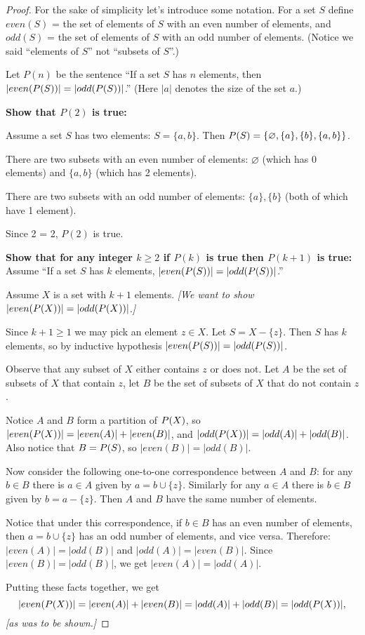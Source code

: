 \documentclass[14pt]{extarticle}
\let\mathscr\relax
\newcommand{\ps}{\mathscr{P}}
\newcommand{\es}{\varnothing}
\begin{document}
\begin{proof}
  For the sake of simplicity let's introduce some notation. For a set $S$ define \(even(S)\) = the set of elements of
  $S$ with an even number of elements, and \(odd(S)\) = the set of elements of $S$ with an odd number of elements.
  (Notice we said ``elements of $S$'' not ``subsets of $S$''.)

  Let $P(n)$ be the sentence “If a set $S$ has $n$ elements, then \(|even(\ps(S))| = |odd(\ps(S))|\).” (Here $|a|$ denotes the size of the set $a$.)

  {\bf Show that $P(2)$ is true:}

  Assume a set $S$ has two elements: \(S = \{a, b\}\). Then \(\ps(S) = \{\es, \{a\}, \{b\}, \{a, b\}\}\).

  There are two subsets with an even number of elements: \(\es\) (which has 0 elements) and \(\{a, b\}\) (which has 2
  elements).

  There are two subsets with an odd number of elements: \(\{a\}, \{b\}\) (both of which have 1 element).

  Since 2 = 2, $P(2)$ is true.

    {\bf Show that for any integer $k \geq 2$ if $P(k)$ is true then $P(k+1)$ is true:} Assume “If a set $S$ has $k$ elements, \(|even(\ps(S))| = |odd(\ps(S))|\).”

  Assume $X$ is a set with $k+1$ elements. {\it [We want to show \(|even(\ps(X))| = |odd(\ps(X))|\).]}

  Since $k+1 \geq 1$ we may pick an element $z \in X$. Let $S = X - \{z\}$. Then $S$ has $k$ elements, so by inductive hypothesis \(|even(\ps(S))| = |odd(\ps(S))|\).

  Observe that any subset of $X$ either contains $z$ or does not. Let $A$ be the set of subsets of $X$ that contain $z$,
  let $B$ be the set of subsets of $X$ that do not contain $z$.

  Notice $A$ and $B$ form a partition of $\ps(X)$, so \(|even(\ps(X))| = |even(A)| + |even(B)|\), and \(|
  odd(\ps(X))| = |odd(A)| + |odd(B)|\). Also notice that \(B = \ps(S)\), so \(|even(B)| = |odd(B)|\).

  Now consider the following one-to-one correspondence between $A$ and $B$: for any $b \in B$ there is $a \in A$
  given by \(a = b \cup \{z\}\). Similarly for any $a \in A$ there is $b \in B$ given by \(b = a - \{z\}\). Then $A$ and
  $B$ have the same number of elements.

  Notice that under this correspondence, if $b \in B$ has an even number of elements, then \(a = b \cup \{z\}\) has an
  odd number of elements, and vice versa. Therefore: \(|even(A)| = |odd(B)|\) and \(|odd(A)| = |even(B)|\). Since
  \(|even(B)| = |odd(B)|\), we get \(|even(A)| = |odd(A)|\).

  Putting these facts together, we get
  \[
    |even(\ps(X))| = |even(A)| + |even(B)| = |odd(A)| + |odd(B)| = |odd(\ps(X))|,
  \]
  {\it [as was to be shown.]}
\end{proof}
\end{document}
